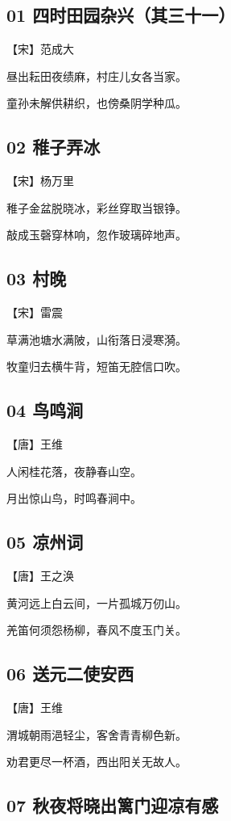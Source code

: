 \documentclass[12pt]{article}
\begin{document}
\subsection*{01 四时田园杂兴（其三十一）}

【宋】范成大

昼出耘田夜绩麻，村庄儿女各当家。

童孙未解供耕织，也傍桑阴学种瓜。

\subsection*{02 稚子弄冰}

【宋】杨万里

稚子金盆脱晓冰，彩丝穿取当银铮。

敲成玉磬穿林响，忽作玻璃碎地声。

\subsection*{03 村晚}


【宋】雷震

草满池塘水满陂，山衔落日浸寒漪。

牧童归去横牛背，短笛无腔信口吹。

\subsection*{04 鸟鸣涧}

【唐】王维

人闲桂花落，夜静春山空。

月出惊山鸟，时鸣春涧中。

\subsection*{05 凉州词}

【唐】王之涣

黄河远上白云间，一片孤城万仞山。

羌笛何须怨杨柳，春风不度玉门关。

\subsection*{06 送元二使安西}

【唐】王维

渭城朝雨浥轻尘，客舍青青柳色新。

劝君更尽一杯酒，西出阳关无故人。

\subsection*{07 秋夜将晓出篱门迎凉有感}
\end{document}
